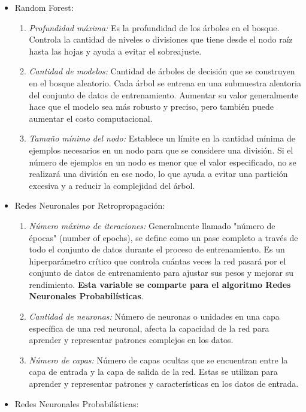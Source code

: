 \begin{itemize}
	\item Random Forest:
	\begin{enumerate}
		\item \textit{Profundidad máxima:} Es la profundidad de los árboles en el bosque. Controla la cantidad de niveles o divisiones que tiene desde el nodo raíz hasta las hojas y ayuda a evitar el sobreajuste.
		\item \textit{Cantidad de modelos:} Cantidad de árboles de decisión que se construyen en el bosque aleatorio. Cada árbol se entrena en una submuestra aleatoria del conjunto de datos de entrenamiento. Aumentar su valor generalmente hace que el modelo sea más robusto y preciso, pero también puede aumentar el costo computacional.
		\item \textit{Tamaño mínimo del nodo:} Establece un límite en la cantidad mínima de ejemplos necesarios en un nodo para que se considere una división. Si el número de ejemplos en un nodo es menor que el valor especificado, no se realizará una división en ese nodo, lo que ayuda a evitar una partición excesiva y a reducir la complejidad del árbol.
	\end{enumerate}
	\item Redes Neuronales por Retropropagación:
	\begin{enumerate}
		\item \textit{Número máximo de iteraciones: }Generalmente llamado "número de épocas" (number of epochs), se define como un pase completo a través de todo el conjunto de datos durante el proceso de entrenamiento. Es un hiperparámetro crítico que controla cuántas veces la red pasará por el conjunto de datos de entrenamiento para ajustar sus pesos y mejorar su rendimiento. \textbf{Esta variable se comparte para el algoritmo Redes Neuronales Probabilísticas}.
		\item \textit{Cantidad de neuronas:} Número de neuronas o unidades en una capa específica de una red neuronal, afecta la capacidad de la red para aprender y representar patrones complejos en los datos.
		\item \textit{Número de capas:} Número de capas ocultas que se encuentran entre la capa de entrada y la capa de salida de la red. Estas se utilizan para aprender y representar patrones y características en los datos de entrada.
	\end{enumerate}
	\item Redes Neuronales Probabilísticas:
	\begin{enumerate}

\end{enumerate}
\end{itemize}
